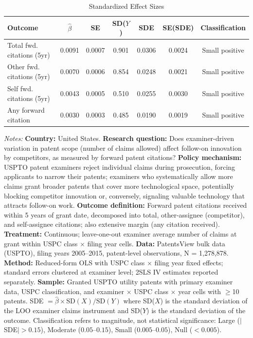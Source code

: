 \begin{table}[htbp]
\centering
\caption{Standardized Effect Sizes}
\label{tab:sde}
\small
\begin{tabular}{lcccccc}
\hline\hline
Outcome & $\hat{\beta}$ & SE & SD($Y$) & SDE & SE(SDE) & Classification \\
\hline
Total fwd. citations (5yr) & 0.0091 & 0.0007 & 0.901 & 0.0306 & 0.0024 & Small positive \\
Other fwd. citations (5yr) & 0.0070 & 0.0006 & 0.854 & 0.0248 & 0.0021 & Small positive \\
Self fwd. citations (5yr) & 0.0043 & 0.0005 & 0.510 & 0.0255 & 0.0030 & Small positive \\
Any forward citation & 0.0030 & 0.0003 & 0.485 & 0.0190 & 0.0019 & Small positive \\
\hline\hline
\end{tabular}
\begin{tablenotes}
\small
\item \textit{Notes:} \textbf{Country:} United States. \textbf{Research question:} Does examiner-driven variation in patent scope (number of claims allowed) affect follow-on innovation by competitors, as measured by forward patent citations? \textbf{Policy mechanism:} USPTO patent examiners reject individual claims during prosecution, forcing applicants to narrow their patents; examiners who systematically allow more claims grant broader patents that cover more technological space, potentially blocking competitor innovation or, conversely, signaling valuable technology that attracts follow-on work. \textbf{Outcome definition:} Forward patent citations received within 5 years of grant date, decomposed into total, other-assignee (competitor), and self-assignee citations; also extensive margin (any citation received). \textbf{Treatment:} Continuous; leave-one-out examiner average number of claims at grant within USPC class $\times$ filing year cells. \textbf{Data:} PatentsView bulk data (USPTO), filing years 2005--2015, patent-level observations, N = 1,278,878. \textbf{Method:} Reduced-form OLS with USPC class $\times$ filing year fixed effects; standard errors clustered at examiner level; 2SLS IV estimates reported separately. \textbf{Sample:} Granted USPTO utility patents with primary examiner data, USPC classification, and examiner $\times$ USPC class $\times$ year cells with $\geq$10 patents. SDE $= \hat{\beta} \times \text{SD}(X) / \text{SD}(Y)$ where SD($X$) is the standard deviation of the LOO examiner claims instrument and SD($Y$) is the standard deviation of the outcome. Classification refers to magnitude, not statistical significance: Large ($|$SDE$| > 0.15$), Moderate ($0.05$--$0.15$), Small ($0.005$--$0.05$), Null ($< 0.005$). 
\end{tablenotes}
\end{table}
